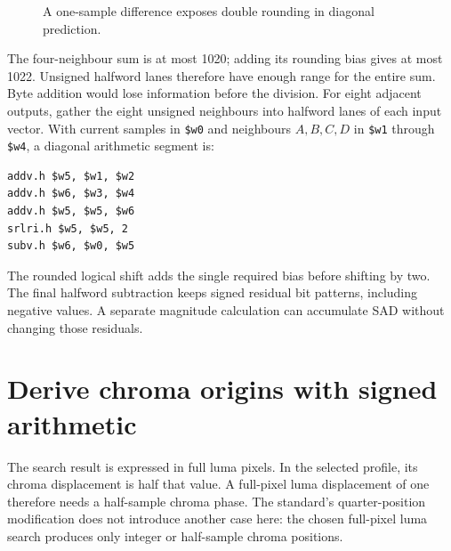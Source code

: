 \begin{figure}[htbp]
  \centering
  \caption{A one-sample difference exposes double rounding in diagonal prediction.}
\end{figure}

The four-neighbour sum is at most 1020; adding its rounding bias gives at most
1022. Unsigned halfword lanes therefore have enough range for the entire sum.
Byte addition would lose information before the division. For eight adjacent
outputs, gather the eight unsigned neighbours into halfword lanes of each input
vector. With current samples in \texttt{\$w0} and neighbours $A,B,C,D$ in
\texttt{\$w1} through \texttt{\$w4}, a diagonal arithmetic segment is:
\begin{verbatim}
addv.h $w5, $w1, $w2
addv.h $w6, $w3, $w4
addv.h $w5, $w5, $w6
srlri.h $w5, $w5, 2
subv.h $w6, $w0, $w5
\end{verbatim}
The rounded logical shift adds the single required bias before shifting by two.
The final halfword subtraction keeps signed residual bit patterns, including
negative values. A separate magnitude calculation can accumulate SAD without
changing those residuals.

\section{Derive chroma origins with signed arithmetic}
The search result is expressed in full luma pixels. In the selected profile,
its chroma displacement is half that value. A full-pixel luma displacement of
one therefore needs a half-sample chroma phase. The standard's quarter-position
modification does not introduce another case here: the chosen full-pixel luma
search produces only integer or half-sample chroma positions.

